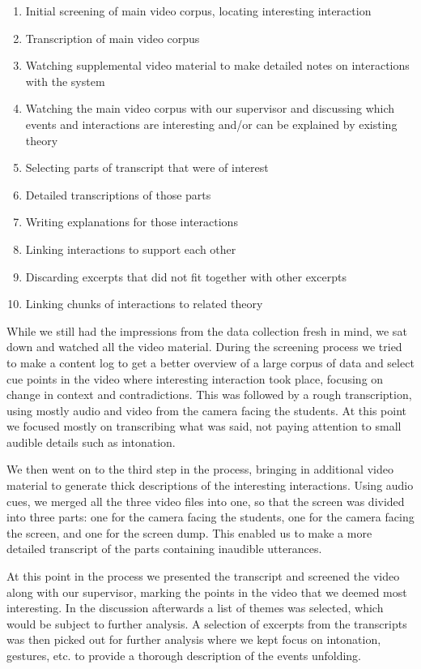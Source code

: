 \begin{enumerate}
\item{Initial screening of main video corpus, locating interesting interaction}
\item{Transcription of main video corpus}
\item{Watching supplemental video material to make detailed notes on interactions with the system}
\item{Watching the main video corpus with our supervisor and discussing which events and interactions are interesting and/or can be explained by existing theory}
\item{Selecting parts of transcript that were of interest}
\item{Detailed transcriptions of those parts}
\item{Writing explanations for those interactions}
\item{Linking interactions to support each other}
\item{Discarding excerpts that did not fit together with other excerpts}
\item{Linking chunks of interactions to related theory}
\end{enumerate}

While we still had the impressions from the data collection fresh in mind, we sat down and watched all the video material. During the screening process we tried to make a content log to get a better overview of a large corpus of data and select cue points in the video where interesting interaction took place, focusing on change in context and contradictions. This was followed by a rough transcription, using mostly audio and video from the camera facing the students. At this point we focused mostly on transcribing what was said, not paying attention to small audible details such as intonation. 

We then went on to the third step in the process, bringing in additional video material to generate thick descriptions of the interesting interactions. Using audio cues, we merged all the three video files into one, so that the screen was divided into three parts: one for the camera facing the students, one for the camera facing the screen, and one for the screen dump. This enabled us to make a more detailed transcript of the parts containing inaudible utterances.

At this point in the process we presented the transcript and screened the video along with our supervisor, marking the points in the video that we deemed most interesting. In the discussion afterwards a list of themes was selected, which would be subject to further analysis. A selection of excerpts from the transcripts was then picked out for further analysis where we kept focus on intonation, gestures, etc. to provide a thorough description of the events unfolding. 

